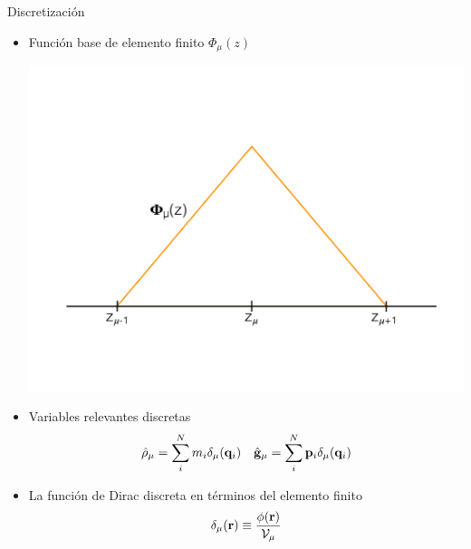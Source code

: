 \documentclass{beamer}
\begin{document}
\begin{frame}{Discretización}
  \begin{itemize}
    \item Función base de elemento finito $\Phi_{\mu}(z)$
    \begin{center} 
      \includegraphics[width = 0.5\linewidth]{psichi-defensa}
    \end{center}
  \item Variables relevantes discretas
\begin{align}
  \hat{\rho}_\mu= \sum_i^Nm_i\delta_\mu({\bf q}_i) &&
\hat{\bf g}_\mu= \sum_i^N{\bf p}_i\delta_\mu({\bf q}_i)
\nonumber
\end{align}
\item La función de Dirac discreta en términos del elemento finito
  \begin{align}
    \delta_{\mu}({\bf r}) \equiv \frac{\phi({\bf r})}{{\cal V}_{\mu}}
    \nonumber
  \end{align}
\end{itemize}

\end{frame}
\end{document}
